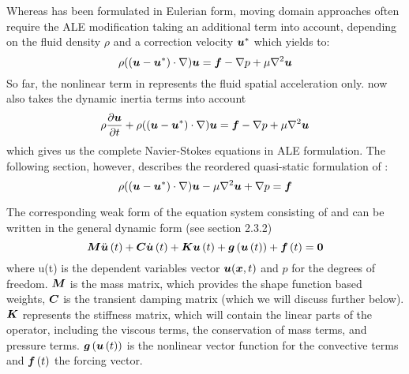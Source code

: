 Whereas  has been formulated in Eulerian form, moving domain approaches often require the ALE modification taking an additional term into account, depending on the fluid density $\rho$ and a correction velocity $\vect{u}^*$ which yields to:
\begin{equation}
    \rho((\vect{u}-\vect{u}^*)\cdot\grad)\vect{u}=\vect{f}-\grad{p}+\mu\laplacian{\vect{u}}
  \label{eqn:NavierStokesequationALE}
\end{equation}
So far, the nonlinear term in  represents the fluid spatial acceleration only.  now also takes the dynamic inertia terms into account
\begin{equation}
    \rho\delby{\vect{u}}{t}+ \rho((\vect{u}-\vect{u}^*)\cdot\grad)\vect{u}=\vect{f}-\grad{p}+\mu\laplacian{\vect{u}}
  \label{eqn:NavierStokesequation2}
\end{equation}
which gives us the complete Navier-Stokes equations in ALE formulation.
The following section, however, describes the reordered quasi-static formulation of  :
\begin{equation}
\rho((\vect{u}-\vect{u}^*)\cdot\grad)\vect{u}-\mu\laplacian{\vect{u}}+\grad{p}=\vect{f}
  \label{eqn:NavierStokesequationALE2}
\end{equation}


The corresponding weak form of the equation system consisting of  and  can be written in the general dynamic form (see section 2.3.2)
\begin{equation}
  \matr{M}\fnof{\ddot{\vect{u}}}{t}+\matr{C}\fnof{\dot{\vect{u}}}{t}+\matr{K}\fnof{\vect{u}}{t}+
  \fnof{\vect{g}}{\fnof{\vect{u}}{t}}+\fnof{\vect{f}}{t}=\vect{0}
  \label{eqn:generaldynamicnonlinear}
\end{equation}
where u(t) is the dependent variables vector $\vect{u}(\vect{x},t)$ and $p$ for the degrees of freedom. $\matr{M}$ is the mass matrix, which provides the shape function based weights, $\matr{C}$ is the transient damping matrix (which we will discuss further below). $\matr{K}$ represents the stiffness matrix, which will contain the linear parts of the operator, including the viscous terms, the conservation of mass terms, and pressure terms. $\fnof{\vect{g}}{\fnof{\vect{u}}{t}}$ is the nonlinear vector function for the convective terms and $\fnof{\vect{f}}{t}$ the forcing vector. 

